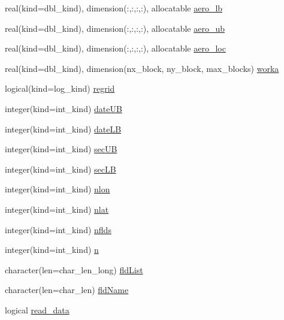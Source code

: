\begin{DoxyCompactItemize}
\item 
real(kind=dbl\_\-kind), dimension(:,:,:,:), allocatable \hyperlink{namespaceice__prescaero__mod_acd22778b78cac460f018ccef7ec19441}{aero\_\-lb}
\item 
real(kind=dbl\_\-kind), dimension(:,:,:,:), allocatable \hyperlink{namespaceice__prescaero__mod_a5da19bde8a1695cce4a672195097610a}{aero\_\-ub}
\item 
real(kind=dbl\_\-kind), dimension(:,:,:,:), allocatable \hyperlink{namespaceice__prescaero__mod_a0bde5e1bf6589d6060071642738d53be}{aero\_\-loc}
\item 
real(kind=dbl\_\-kind), dimension(nx\_\-block, ny\_\-block, max\_\-blocks) \hyperlink{namespaceice__prescaero__mod_a425d07f2285f906fd3d7feb2590c6381}{worka}
\item 
logical(kind=log\_\-kind) \hyperlink{namespaceice__prescaero__mod_af47c8a64b468928d1aaad008ef8609d8}{regrid}
\item 
integer(kind=int\_\-kind) \hyperlink{namespaceice__prescaero__mod_a30a561e9f5e6d98c4f0ea75abe09c691}{dateUB}
\item 
integer(kind=int\_\-kind) \hyperlink{namespaceice__prescaero__mod_a6be4e65c946ef5d7a771830e380b7a98}{dateLB}
\item 
integer(kind=int\_\-kind) \hyperlink{namespaceice__prescaero__mod_a635da64637bdade19196f7e407c86f3b}{secUB}
\item 
integer(kind=int\_\-kind) \hyperlink{namespaceice__prescaero__mod_a93fbf6de60396f73513b16a2d0230a0b}{secLB}
\item 
integer(kind=int\_\-kind) \hyperlink{namespaceice__prescaero__mod_a06c7ca3e93cd15535e2ed6f3cd5bf314}{nlon}
\item 
integer(kind=int\_\-kind) \hyperlink{namespaceice__prescaero__mod_a7b9a21f0e090fc79f73045a9e324d08f}{nlat}
\item 
integer(kind=int\_\-kind) \hyperlink{namespaceice__prescaero__mod_ab653a95f175ec939e8476b301828c31e}{nflds}
\item 
integer(kind=int\_\-kind) \hyperlink{namespaceice__prescaero__mod_a9aac3151343a550064a4ea724d9cdb6f}{n}
\item 
character(len=char\_\-len\_\-long) \hyperlink{namespaceice__prescaero__mod_a3be7ab6e22248b38d141107dd0ee2a59}{fldList}
\item 
character(len=char\_\-len) \hyperlink{namespaceice__prescaero__mod_a3ec9a560b31f3c5c6bc587e700ee9570}{fldName}
\item 
logical \hyperlink{namespaceice__prescaero__mod_af2c2ae945aa6208a444abc903ead27d9}{read\_\-data}
\end{DoxyCompactItemize}


